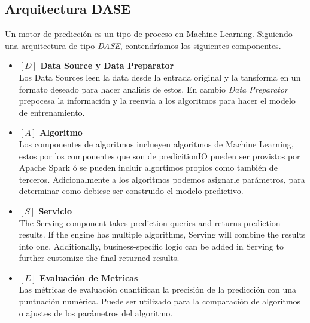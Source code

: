 



\subsection{Arquitectura DASE}


Un motor de predicción es un tipo de proceso en Machine Learning. Siguiendo una arquitectura de tipo \emph{DASE}, contendríamos los siguientes componentes.



\begin{itemize}

  \item \textbf{ $[D]$ Data Source y Data Preparator }\\
  Los Data Sources leen la data desde la entrada original y la tansforma en un formato deseado para hacer analisis de estos. En cambio \emph{Data Preparator} prepocesa la información y la reenvía a los algoritmos para   hacer el modelo de entrenamiento.


    \item \textbf{ $[A]$ Algoritmo}\\
  Los componentes de algoritmos inclueyen algoritmos de Machine Learning, estos por los componentes que son de predicitionIO pueden ser provistos por Apache Spark ó se pueden incluir algortimos propios como también de terceros.
  Adicionalmente a los algoritmos podemos asignarle parámetros, para determinar como debiese ser construido el modelo predictivo.



    \item \textbf{ $[S]$ Servicio}\\
  The Serving component takes prediction queries and returns prediction results. If the engine has multiple algorithms, Serving will combine the results into one. Additionally, business-specific logic can be added in Serving to further customize the final returned results.

    \item \textbf{ $[E]$ Evaluación de Metricas}\\
  Las métricas de evaluación cuantifican la precisión de la predicción con una puntuación numérica. Puede ser utilizado para la comparación de algoritmos o ajustes de los parámetros del algoritmo.


\end{itemize}



